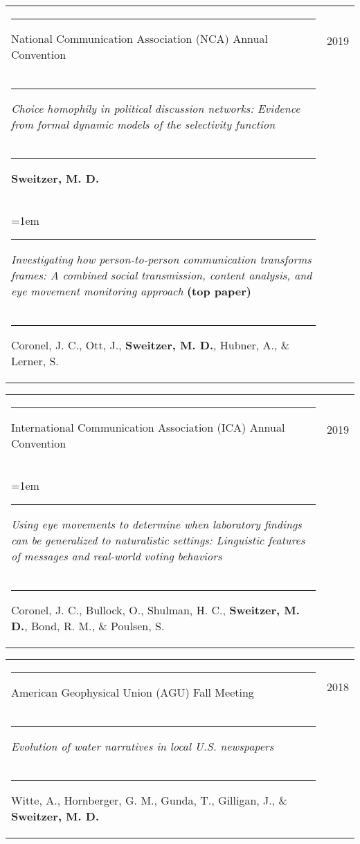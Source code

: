 \documentclass[letterpaper, 10pt]{extarticle}
\begin{document}
\vspace{0.5em}
\begin{tabularx}{\textwidth}{Xr}
\rule{0.5em}{0pt}{\small National Communication Association (NCA) Annual Convention} & {\small 2019}\vspace{0.25em}\\
\rule{1em}{0pt}{\raggedright \small \textit{Choice homophily in political discussion networks: Evidence from formal dynamic models of the selectivity function}}\\
\rule{1.25em}{0pt}{\small \textbf{Sweitzer, M. D.}}\vspace{0.5em}\\

\hangindent=1em \rule{1em}{0pt}{\raggedright \small \textit{Investigating how person-to-person communication transforms frames: A combined social transmission, content analysis, and eye movement monitoring approach} \textbf{(top paper)}}\\
\rule{1.25em}{0pt}{\small Coronel, J. C., Ott, J., \textbf{Sweitzer, M. D.}, Hubner, A., \& Lerner, S.}
\end{tabularx}

\vspace{0.5em}
\begin{tabularx}{\textwidth}{Xr}
\rule{0.5em}{0pt}{\small International Communication Association (ICA) Annual Convention} & {\small 2019}\vspace{0.25em}\\
\hangindent=1em \rule{1em}{0pt}{\raggedright \small \textit{Using eye movements to determine when laboratory findings can be generalized to naturalistic settings: Linguistic features of messages and real-world voting behaviors}}\\
\rule{1.25em}{0pt}{\small Coronel, J. C., Bullock, O., Shulman, H. C., \textbf{Sweitzer, M. D.}, Bond, R. M., \& Poulsen, S.}
\end{tabularx}

\vspace{0.5em}
\begin{tabularx}{\textwidth}{Xr}
\rule{0.5em}{0pt}{\small American Geophysical Union (AGU) Fall Meeting} & {\small 2018}\vspace{0.25em}\\
\rule{1em}{0pt}{\raggedright \small \textit{Evolution of water narratives in local U.S. newspapers}}\\
\rule{1.25em}{0pt}{\small Witte, A., Hornberger, G. M., Gunda, T., Gilligan, J., \& \textbf{Sweitzer, M. D.}}
\end{tabularx}
\end{document}
